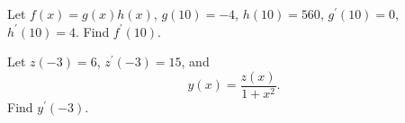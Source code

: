 \documentclass[10pt]{amsart}
\begin{document}
\vspace{1.25in}

\begin{thm}
  Let \(f(x) = g(x)h(x)\), \(g(10) = -4\), \(h(10) = 560\), \(g^\prime(10) = 0\), \(h^\prime(10) = 4\).
  Find \(f^\prime(10)\).
\end{thm}

\vspace{2in}

\begin{thm}
  Let \(z(-3) = 6\), \(z^\prime(-3) = 15\), and
  \[y(x) = \frac{z(x)}{1 + x^2}.\]
  Find \(y^\prime(-3)\).
\end{thm}
\end{document}
